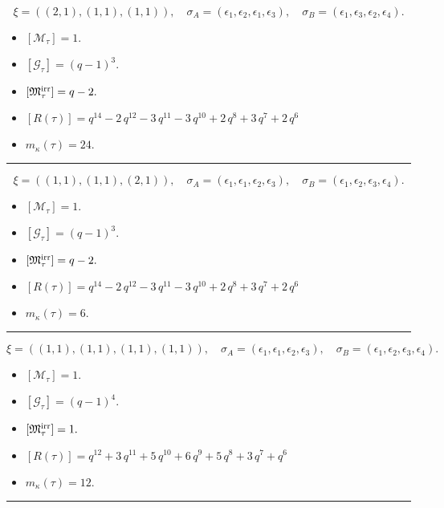\documentclass[10pt,a4paper]{amsart}
\begin{document}
$$\xi = ({(2, 1), (1, 1), (1, 1)}),\quad \sigma_A = ({{\epsilon_1, \epsilon_2}, {\epsilon_1}, {\epsilon_3}}),\quad \sigma_B = ({{\epsilon_1, \epsilon_3}, {\epsilon_2}, {\epsilon_4}}).$$

\begin{itemize}
 \item $[\mathcal{M}_{\tau}] = 1 .$

 \item $[\mathcal{G}_{\tau}] = {\left(q - 1\right)}^{3} .$

 \item $[{\frak M}_{\tau}^{\textrm{irr}}] = q - 2 .$

 \item $[R(\tau)] = q^{14} - 2 \, q^{12} - 3 \, q^{11} - 3 \, q^{10} + 2 \, q^{8} + 3 \, q^{7} + 2 \, q^{6} $

 \item $m_{\kappa}(\tau) = 24 .$

 \end{itemize}
\noindent\rule{8cm}{0.4pt}

$$\xi = ({(1, 1), (1, 1), (2, 1)}),\quad \sigma_A = ({{\epsilon_1}, {\epsilon_1}, {\epsilon_2, \epsilon_3}}),\quad \sigma_B = ({{\epsilon_1}, {\epsilon_2}, {\epsilon_3, \epsilon_4}}).$$

\begin{itemize}
 \item $[\mathcal{M}_{\tau}] = 1 .$

 \item $[\mathcal{G}_{\tau}] = {\left(q - 1\right)}^{3} .$

 \item $[{\frak M}_{\tau}^{\textrm{irr}}] = q - 2 .$

 \item $[R(\tau)] = q^{14} - 2 \, q^{12} - 3 \, q^{11} - 3 \, q^{10} + 2 \, q^{8} + 3 \, q^{7} + 2 \, q^{6} $

 \item $m_{\kappa}(\tau) = 6 .$

 \end{itemize}
\noindent\rule{8cm}{0.4pt}

$$\xi = ({(1, 1), (1, 1), (1, 1), (1, 1)}),\quad \sigma_A = ({{\epsilon_1}, {\epsilon_1}, {\epsilon_2}, {\epsilon_3}}),\quad \sigma_B = ({{\epsilon_1}, {\epsilon_2}, {\epsilon_3}, {\epsilon_4}}).$$

\begin{itemize}
 \item $[\mathcal{M}_{\tau}] = 1 .$

 \item $[\mathcal{G}_{\tau}] = {\left(q - 1\right)}^{4} .$

 \item $[{\frak M}_{\tau}^{\textrm{irr}}] = 1 .$

 \item $[R(\tau)] = q^{12} + 3 \, q^{11} + 5 \, q^{10} + 6 \, q^{9} + 5 \, q^{8} + 3 \, q^{7} + q^{6} $

 \item $m_{\kappa}(\tau) = 12 .$

 \end{itemize}
\noindent\rule{8cm}{0.4pt}
\end{document}
